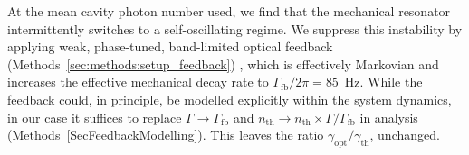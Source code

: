 \documentclass[aps,prx,twocolumn,amsmath,amssymb,superscriptaddress,floatfix,longbibliography
]{revtex4-2}
\begin{document}
At the mean cavity photon number used,
we find that the mechanical resonator intermittently switches to a self-oscillating regime.
We suppress this instability by applying weak, phase-tuned, band-limited optical feedback (Methods~\ref{sec:methods:setup_feedback})
, which is effectively Markovian and increases the effective mechanical decay rate to $\Gamma_\text{fb}/2\pi = 85$~Hz. 
While the feedback could, in principle, be modelled explicitly within the system dynamics, in our case it suffices to replace $\Gamma\to\Gamma_\text{fb}$ and $n_\text{th}\to n_\text{th}\times\Gamma/\Gamma_\text{fb}$ in analysis (Methods~\ref{SecFeedbackModelling}). 
This leaves the ratio $\gamma_\text{opt}/\gamma_\text{th}$, unchanged.

\end{document}
